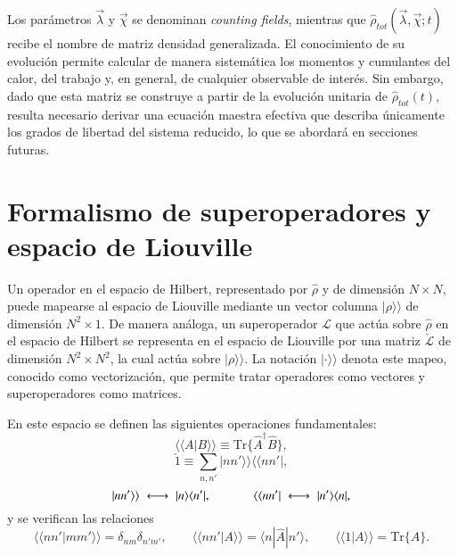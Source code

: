 Los parámetros $\vec{\lambda}$ y $\vec{\chi}$ se denominan \textit{counting fields}\cite{esposito2009nonequilibrium,landi2024current}, mientras que $\hat{\rho}_{tot}(\vec{\lambda},\vec{\chi};t)$ recibe el nombre de matriz densidad generalizada. El conocimiento de su evolución permite calcular de manera sistemática los momentos y cumulantes del calor, del trabajo y, en general, de cualquier observable de interés. Sin embargo, dado que esta matriz se construye a partir de la evolución unitaria de $\hat{\rho}_{tot}(t)$, resulta necesario derivar una ecuación maestra efectiva que describa únicamente los grados de libertad del sistema reducido, lo que se abordará en secciones futuras.


\label{sec2:estadistica2puntos}

\section{Formalismo de superoperadores y espacio de Liouville} 

Un operador en el espacio de Hilbert, representado por $\hat{\rho}$ y de dimensión $N\times N$, puede mapearse al espacio de Liouville mediante un vector columna $|\rho \rangle \rangle$ de dimensión $N^{2}\times 1$. De manera análoga, un superoperador $\mathcal{L}$ que actúa sobre $\hat{\rho}$ en el espacio de Hilbert se representa en el espacio de Liouville por una matriz $\check{\mathcal{L}}$ de dimensión $N^2 \times N^2$, la cual actúa sobre $|\rho\rangle\rangle$. La notación $|\cdot\rangle\rangle$ denota este mapeo, conocido como vectorización, que permite tratar operadores como vectores y superoperadores como matrices.

En este espacio se definen las siguientes operaciones fundamentales:
\begin{equation*}
    \langle \langle A|B\rangle \rangle  \equiv \text{Tr}\{\hat{A}^{\dagger}\hat{B}\},
\end{equation*}
\begin{equation*}
    \check{1}  \equiv \sum_{n,n'}|nn'\rangle \rangle \langle \langle nn'|,
\end{equation*}
\begin{equation*}
     |nn'\rangle \rangle \;\longleftrightarrow\; |n\rangle \langle n'|,
     \hspace{12mm}  
     \langle \langle nn'| \;\longleftrightarrow\; |n'\rangle \langle n|,
\end{equation*}
y se verifican las relaciones
\begin{equation*}
     \langle \langle nn'|mm'\rangle \rangle  = \delta_{nm}\delta_{n'm'},
     \qquad
     \langle \langle nn'|A\rangle \rangle  = \langle n|\hat{A}|n'\rangle,
     \qquad
     \langle \langle 1|A\rangle \rangle  = \text{Tr}\{\hat{A}\}.
\end{equation*}

